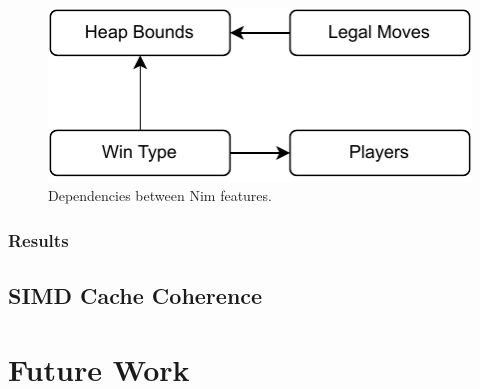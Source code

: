 \documentclass[sigplan,anonymous,review]{acmart}
\begin{document}
\begin{figure}[h]
    \centering
    \includegraphics{figures/NimFeatures.pdf}
    \caption{Dependencies between Nim features.}
    \label{fig:nimDependencies}
\end{figure}

\subsubsection{Results}\label{sec:nim:results}

\subsection{SIMD Cache Coherence}\label{sec:cache}

\section{Future Work}


\end{document}

